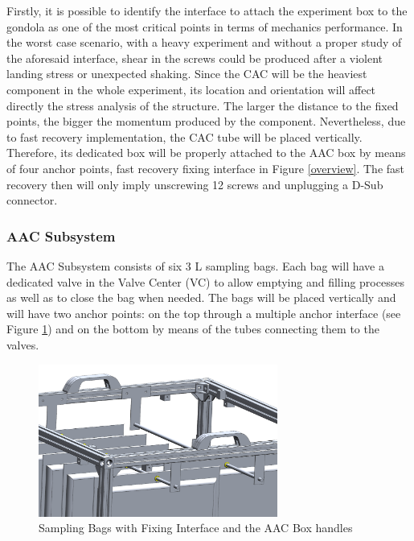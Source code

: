 \smallskip
Firstly, it is possible to identify the interface to attach the experiment box to the gondola as one of the most critical points in terms of mechanics performance. In the worst case scenario, with a heavy experiment and without a proper study of the aforesaid interface, shear in the screws could be produced after a violent landing stress or unexpected shaking. Since the CAC will be the heaviest component in the whole experiment, its location and orientation will affect directly the stress analysis of the structure. The larger the distance to the fixed points, the bigger the momentum produced by the component. Nevertheless, due to fast recovery implementation, the CAC tube will be placed vertically. Therefore, its dedicated box will be properly attached to the AAC box by means of four anchor points, fast recovery fixing interface in Figure \ref{overview}. The fast recovery then will only imply unscrewing 12 screws and unplugging a D-Sub connector. 


\pagebreak
\subsubsection{AAC Subsystem}\label{sec:aac-analysis}


The AAC Subsystem consists of six  3 L sampling bags. Each bag will have a dedicated valve in the Valve Center (VC) to allow emptying and filling processes as well as to close the bag when needed. The bags will be placed vertically and will have two anchor points: on the top through a  multiple anchor interface (see Figure \ref{anchor_bags}) and on the bottom by means of the tubes connecting them to the valves.




\begin{figure}[H]
    \centering
    \includegraphics[width=0.7\textwidth]{4-experiment-design/img/Mechanical/Bags_Fixing_Interface.png}
    \caption{Sampling Bags with Fixing Interface and the AAC Box handles}
    \label{anchor_bags}
\end{figure}


